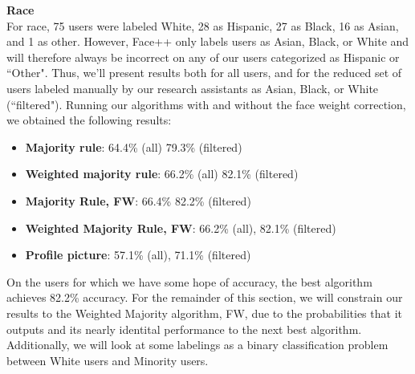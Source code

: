 \textbf{Race} \\

For race, 75 users were labeled White, 28 as Hispanic, 27 as Black, 16 as Asian, and 1 as other.
However, Face++ only labels users as Asian, Black, or White and will therefore always be incorrect on any of our users categorized as Hispanic or ``Other".
Thus, we'll present results both for all users, and for the reduced set of users labeled manually by our research assistants as Asian, Black, or White (``filtered").
Running our algorithms with and without the face weight correction, we obtained the following results:
\begin{itemize}
\item \textbf{Majority rule}: 64.4\% (all) 79.3\% (filtered)
\item \textbf{Weighted majority rule}: 66.2\% (all) 82.1\% (filtered)
\item \textbf{Majority Rule, FW}: 66.4\% 82.2\% (filtered)
\item \textbf{Weighted Majority Rule, FW}: 66.2\% (all), 82.1\% (filtered)
\item \textbf{Profile picture}: 57.1\% (all), 71.1\% (filtered)
\end{itemize}

On the users for which we have some hope of accuracy, the best algorithm achieves 82.2\% accuracy.
For the remainder of this section, we will constrain our results to the Weighted Majority algorithm, FW, due to the probabilities that it outputs and its nearly identital performance to the next best algorithm.
Additionally, we will look at some labelings as a binary classification problem between White users and Minority users.

